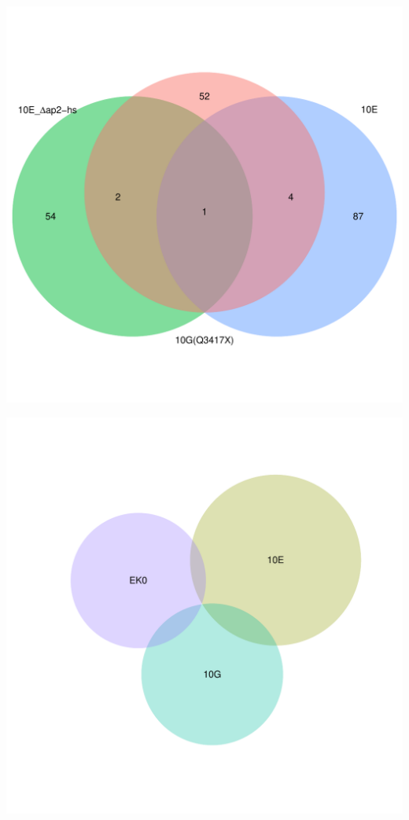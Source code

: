 \documentclass{article}\usepackage[]{graphicx}\usepackage[]{color}
\newenvironment{knitrout}{}{} %
\begin{document}
\begin{knitrout}
\color{fgcolor}

{\centering \includegraphics[width=1\linewidth,height=.4\textheight]{figure/minimal-venn_t1_3fc_down_venn-1} 

}



\end{knitrout}
\begin{knitrout}
\color{fgcolor}

{\centering \includegraphics[width=1\linewidth,height=.4\textheight]{figure/minimal-venn_t1_3fc_down_euler-1} 

}



\end{knitrout}
\clearpage
\end{document}
